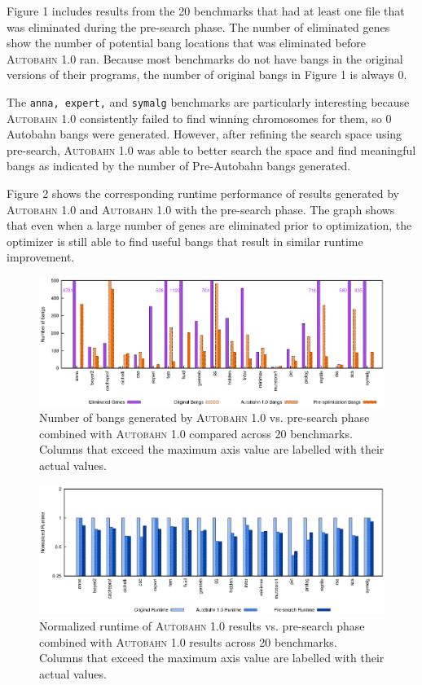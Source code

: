 \documentclass[format=sigplan, review=true]{acmart}
\newcommand{\useful}[0]{useful}
\newcommand{\Ao}[0]{\textsc{Autobahn 1.0}}
\newcommand{\preopt}[0]{pre-search}
\begin{document}
Figure 1 includes results from the 20 benchmarks that had at least one file that was eliminated during the \preopt{} phase. The number of eliminated genes show the number of potential bang locations that was eliminated before \Ao{} ran. Because most benchmarks do not have bangs in the original versions of their programs, the number of original bangs in Figure 1 is always 0. 

The \texttt{anna, expert,} and \texttt{symalg} benchmarks are particularly interesting because \Ao{} consistently failed to find winning chromosomes for them, so 0 Autobahn bangs were generated. However, after refining the search space using \preopt{}, \Ao{} was able to better search the space and find meaningful bangs as indicated by the number of Pre-Autobahn bangs generated. 

Figure 2 shows the corresponding runtime performance of results generated by \Ao{} and \Ao{} with the \preopt{} phase. The graph shows that even when a large number of genes are eliminated prior to optimization, the optimizer is still able to find \useful{} bangs that result in similar runtime improvement.  

\begin{figure}
\includegraphics[width=\textwidth]{pre-aut-bangs}
\caption{Number of bangs generated by \Ao{} vs. \preopt{} phase combined with \Ao{} compared across 20 benchmarks. Columns that exceed the maximum axis value are labelled with their actual values.}
\end{figure}

\begin{figure}
\includegraphics[width=\textwidth]{pre-aut}
\caption{Normalized runtime of \Ao{} results vs. \preopt{} phase combined with \Ao{} results across 20 benchmarks. Columns that exceed the maximum axis value are labelled with their actual values.}
\end{figure}
\end{document}
